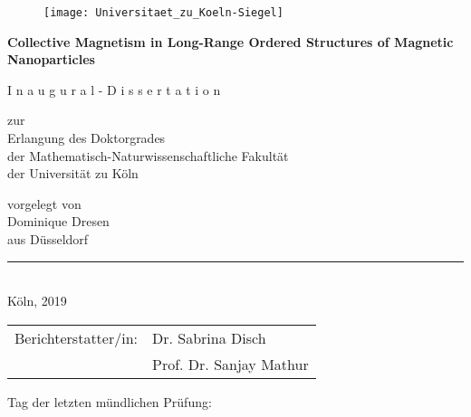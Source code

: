 \begin{titlepage}
  \begin{center}
    \begin{figure}[H]
      \centering
      \texttt{[image: Universitaet\_zu\_Koeln-Siegel]}
    \end{figure}
    \LARGE\textbf{Collective Magnetism in Long-Range Ordered Structures of Magnetic Nanoparticles}

    \vspace{2cm}

    \Large{I n a u g u r a l - D i s s e r t a t i o n } \\

    \vspace{2cm}

    \large{zur}\\
    \large{Erlangung des Doktorgrades}\\
    \large{der Mathematisch-Naturwissenschaftliche Fakult\"at}\\
    \large der Universit\"at zu K\"oln\\

    \vspace{2cm}

    \large{vorgelegt von}\\
    \large{Dominique Dresen}\\
    \large{aus D\"usseldorf}\\

    \vspace{2cm}

    \noindent\rule{14cm}{0.4pt}\\
    \normalsize{Köln, 2019}\\
  \end{center}
\end{titlepage}

\newpage


\vspace{2cm}

\begin{tabular}{@{}ll}
  Berichterstatter/in: & Dr. Sabrina Disch \\
                       & Prof. Dr. Sanjay Mathur
\end{tabular}

\medskip
\vspace{2cm}

Tag der letzten mündlichen Prüfung:



